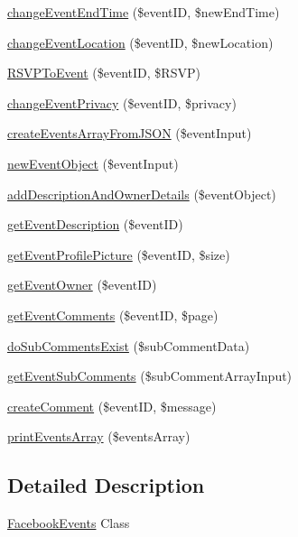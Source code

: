 \begin{DoxyCompactItemize}
\item 
\hyperlink{class_facebook_events_aad31e26bed9aa061d69e258ffc45fe50}{changeEventEndTime} (\$eventID, \$newEndTime)
\item 
\hyperlink{class_facebook_events_ac4210c3afdfae935d32552689020eba9}{changeEventLocation} (\$eventID, \$newLocation)
\item 
\hyperlink{class_facebook_events_ab9008dd813f5cc433752b0dbb50e3064}{RSVPToEvent} (\$eventID, \$RSVP)
\item 
\hyperlink{class_facebook_events_a28488ce215357e133cf4beae1a24f1fa}{changeEventPrivacy} (\$eventID, \$privacy)
\item 
\hyperlink{class_facebook_events_a93b55dd98ecd4a4ac5d3d0f3b3fd1b33}{createEventsArrayFromJSON} (\$eventInput)
\item 
\hyperlink{class_facebook_events_a30dc43be135afad179dee46e341cdaa3}{newEventObject} (\$eventInput)
\item 
\hyperlink{class_facebook_events_a431b53fa28df64cf7bb769fb574f5594}{addDescriptionAndOwnerDetails} (\$eventObject)
\item 
\hyperlink{class_facebook_events_a010ff4c59fbc8fad90b5f5405486c9bc}{getEventDescription} (\$eventID)
\item 
\hyperlink{class_facebook_events_ae9c370c5c706e4dab16f13ee0825f218}{getEventProfilePicture} (\$eventID, \$size)
\item 
\hyperlink{class_facebook_events_a6dd4e22ebd3831d5a8a4b9bd19ce17a0}{getEventOwner} (\$eventID)
\item 
\hyperlink{class_facebook_events_ad91f2e75f3d4e21a285c2ee5166efab1}{getEventComments} (\$eventID, \$page)
\item 
\hyperlink{class_facebook_events_ae0bf0b50e1f979095e0618fea1ce48ad}{doSubCommentsExist} (\$subCommentData)
\item 
\hyperlink{class_facebook_events_a4957e8925bbce1ee66db5e7c7daebbcf}{getEventSubComments} (\$subCommentArrayInput)
\item 
\hyperlink{class_facebook_events_a7ee2cb7b9d6a02e42470ad9feaba0dd2}{createComment} (\$eventID, \$message)
\item 
\hyperlink{class_facebook_events_a8c17e824c9fd4b35d8c22295b190fcfb}{printEventsArray} (\$eventsArray)
\end{DoxyCompactItemize}


\subsection{Detailed Description}
\hyperlink{class_facebook_events}{FacebookEvents} Class

